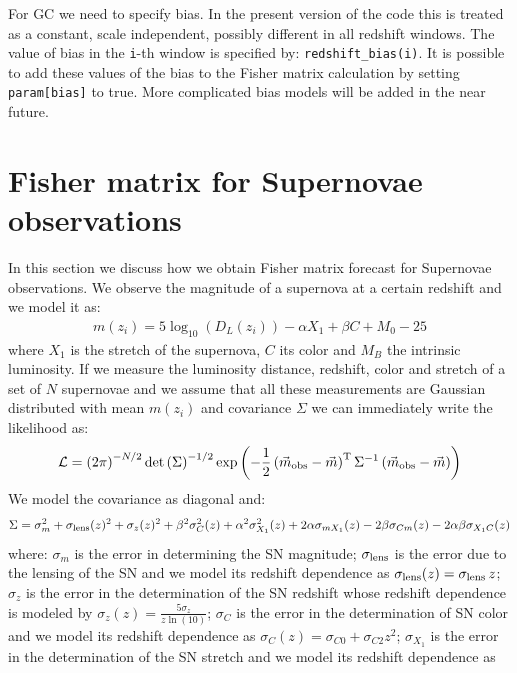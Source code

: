 \documentclass[prd,nofootinbib,showpacs]{revtex4}
\newcommand{\code}[1]{\lstinline|#1|}
\begin{document}
For GC we need to specify bias. In the present version of the code this is treated as a constant, scale independent, possibly different in all redshift windows.
The value of bias in the \code{i}-th window is specified by: \code{redshift_bias(i)}. 
It is possible to add these values of the bias to the Fisher matrix calculation by setting \code{param[bias]} to true. More complicated bias models will be added in the near future. 

%
\section{Fisher matrix for Supernovae observations}
%
In this section we discuss how we obtain Fisher matrix forecast for Supernovae observations.
We observe the magnitude of a supernova at a certain redshift and we model it as:
%
\begin{align}\label{Eq:SNMagnitude}
m(z_i) = 5 \log_{10} \left( D_L(z_i) \right) -\alpha X_1 +\beta C +M_0 -25
\end{align}
%
where $X_1$ is the stretch of the supernova, $C$ its color and $M_B$ the intrinsic luminosity.
%
If we measure the luminosity distance, redshift, color and stretch of a set of $N$ supernovae and we assume that all these measurements are Gaussian distributed with mean $m(z_i)$ and covariance $\Sigma$ we can immediately write the likelihood as:
%
\begin{align} \label{Eq:SNLikelihood}
\mathcal{L} =  \left( 2\pi \right)^{-N/2} \det\left( \Sigma \right)^{-1/2} \exp\left( -\frac{1}{2}\left( \vec{m}_{\rm obs} - \vec{m} \right)^{\rm T}\Sigma^{-1} \left( \vec{m}_{\rm obs} - \vec{m} \right) \right)
\end{align}
%
We model the covariance as diagonal and:
%
\begin{align} \label{Eq:SNCovariance}
\Sigma = \sigma^2_m +\sigma_{\rm lens}(z)^2 +\sigma_z(z)^2 +\beta^2\sigma_C^2(z)  +\alpha^2\sigma_{X_1}^2(z) +2\alpha \sigma_{mX_1}(z) -2\beta\sigma_{Cm}(z) -2\alpha\beta \sigma_{X_1C}(z)
\end{align}
%
where: $\sigma_m$ is the error in determining the SN magnitude; $\sigma_{\rm lens}$ is the error due to the lensing of the SN and we model its redshift dependence as $\sigma_{\rm lens}(z) = \sigma_{\rm lens}\,z$; $\sigma_z$ is the error in the determination of the SN redshift whose redshift dependence is modeled by $\sigma_z(z) = \frac{5 \sigma_z}{z \ln(10)}$; $\sigma_C$ is the error in the determination of SN color and we model its redshift dependence as 
$\sigma_C(z) = \sigma_{C0} + \sigma_{C2}z^2$; $\sigma_{X_1}$ is the error in the determination of the SN stretch and we model its redshift dependence as 
\end{document}
